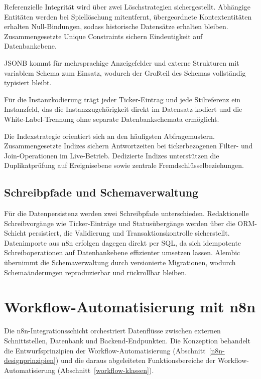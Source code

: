 Referenzielle Integrität wird über zwei Löschstrategien sichergestellt. Abhängige Entitäten werden bei Spiellöschung mitentfernt, übergeordnete Kontextentitäten erhalten Null-Bindungen, sodass historische Datensätze erhalten bleiben. Zusammengesetzte Unique Constraints sichern Eindeutigkeit auf Datenbankebene.

JSONB kommt für mehrsprachige Anzeigefelder und externe Strukturen mit variablem Schema zum Einsatz, wodurch der Großteil des Schemas vollständig typisiert bleibt.

Für die Instanzkodierung trägt jeder Ticker-Eintrag und jede Stilreferenz ein Instanzfeld, das die Instanzzugehörigkeit direkt im Datensatz kodiert und die White-Label-Trennung ohne separate Datenbankschemata ermöglicht.

Die Indexstrategie orientiert sich an den häufigsten Abfragemustern. Zusammengesetzte Indizes sichern Antwortzeiten bei tickerbezogenen Filter- und Join-Operationen im Live-Betrieb. Dedizierte Indizes unterstützen die Duplikatprüfung auf Ereignisebene sowie zentrale Fremdschlüsselbeziehungen.

\subsection{Schreibpfade und Schemaverwaltung}\label{persistenzstrategie}

Für die Datenpersistenz werden zwei Schreibpfade unterschieden. Redaktionelle Schreibvorgänge wie Ticker-Einträge und Statusübergänge werden über die ORM-Schicht persistiert, die Validierung und Transaktionskontrolle sicherstellt. Datenimporte aus n8n erfolgen dagegen direkt per SQL, da sich idempotente Schreiboperationen auf Datenbankebene effizienter umsetzen lassen. Alembic übernimmt die Schemaverwaltung durch versionierte Migrationen, wodurch Schemaänderungen reproduzierbar und rückrollbar bleiben.

\section{Workflow-Automatisierung mit n8n}\label{workflow-konzeption-n8n}

Die n8n-Integrationsschicht orchestriert Datenflüsse zwischen externen Schnittstellen, Datenbank und Backend-Endpunkten. Die Konzeption behandelt die Entwurfsprinzipien der Workflow-Automatisierung (Abschnitt~\ref{n8n-designprinzipien}) und die daraus abgeleiteten Funktionsbereiche der Workflow-Automatisierung (Abschnitt~\ref{workflow-klassen}).

